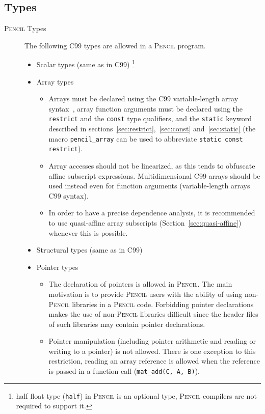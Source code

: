 \documentclass{carp}
\newcommand\pencil{\textsc{Pencil}\xspace}
\newcommand{\C}{C99\xspace}
\begin{document}
\subsection{Types\label{penciltypes}}
\begin{description}
 \item [\pencil Types] The following \C types are allowed in a \pencil program.
 \begin{itemize}
  \item Scalar types (same as in \C)
      \footnote{half float type (\lstinline!half!) in \pencil is an optional
      type, \pencil compilers are not required to support it.}
  \item Array types
  \begin{itemize}
    \item Arrays must be declared using the C99
      variable-length array syntax~\cite{c99}, array function arguments
      must be declared using the \lstinline!restrict! and
      the \lstinline!const! type qualifiers, and the \lstinline!static! keyword
      described in sections~\ref{sec:restrict},~\ref{sec:const}
      and~\ref{sec:static} (the macro \lstinline!pencil_array! can be used to
      abbreviate \lstinline!static const restrict!).
    \item Array accesses should not be linearized, as this tends to
      obfuscate affine subscript expressions.  Multidimensional C99 arrays
      should be used instead even for function arguments (variable-length arrays
      C99 syntax).
    \item In order to have a precise dependence analysis, it is recommended
      to use quasi-affine array subscripts (Section~\ref{sec:quasi-affine})
      whenever this is possible.
  \end{itemize}
  \item Structural types (same as in \C)
  \item Pointer types
  \begin{itemize}
    \item The declaration of pointers is allowed in \pencil.
      The main motivation is to provide \pencil users with the ability
      of using non-\pencil libraries in a \pencil code.
      Forbidding pointer declarations makes the use of non-\pencil libraries
      difficult since the header files of such libraries may contain pointer
      declarations.

    \item Pointer manipulation (including pointer arithmetic and reading or
      writing to a pointer) is not allowed.  There is one exception to this
      restriction, reading an array reference is allowed when the reference is
      passed in a function call (\eg \lstinline!mat_add(C, A, B)!).
      

\end{itemize}
\end{itemize}
\end{description}
\end{document}
